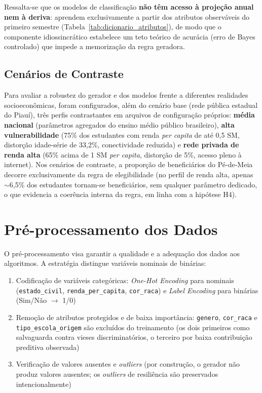Ressalta-se que os modelos de classificação \textbf{não têm acesso à projeção anual nem à deriva}: aprendem exclusivamente a partir dos atributos observáveis do primeiro semestre (Tabela~\ref{tab:dicionario_atributos}), de modo que o componente idiossincrático estabelece um teto teórico de acurácia (erro de Bayes controlado) que impede a memorização da regra geradora.

\subsection{Cenários de Contraste}

Para avaliar a robustez do gerador e dos modelos frente a diferentes realidades socioeconômicas, foram configurados, além do cenário base (rede pública estadual do Piauí), três perfis contrastantes em arquivos de configuração próprios: \textbf{média nacional} (parâmetros agregados do ensino médio público brasileiro), \textbf{alta vulnerabilidade} (75\% dos estudantes com renda \textit{per capita} de até 0,5 SM, distorção idade-série de 33,2\%, conectividade reduzida) e \textbf{rede privada de renda alta} (65\% acima de 1 SM \textit{per capita}, distorção de 5\%, acesso pleno à internet). Nos cenários de contraste, a proporção de beneficiários do Pé-de-Meia decorre exclusivamente da regra de elegibilidade (no perfil de renda alta, apenas $\sim$6,5\% dos estudantes tornam-se beneficiários, sem qualquer parâmetro dedicado, o que evidencia a coerência interna da regra, em linha com a hipótese H4).

\section{Pré-processamento dos Dados}

O pré-processamento visa garantir a qualidade e a adequação dos dados aos algoritmos. A estratégia distingue variáveis nominais de binárias:

\begin{enumerate}
    \sloppy
    \item Codificação de variáveis categóricas: \textit{One-Hot Encoding} para nominais (\texttt{estado\_civil}, \texttt{renda\_per\_capita}, \texttt{cor\_raca}) e \textit{Label Encoding} para binárias (Sim/Não $\rightarrow$ 1/0)
    \item Remoção de atributos protegidos e de baixa importância: \texttt{genero}, \texttt{cor\_raca} e \texttt{tipo\_escola\_origem} são excluídos do treinamento (os dois primeiros como salvaguarda contra vieses discriminatórios, o terceiro por baixa contribuição preditiva observada)
    \item Verificação de valores ausentes e \textit{outliers} (por construção, o gerador não produz valores ausentes; os \textit{outliers} de resiliência são preservados intencionalmente)
\end{enumerate}

